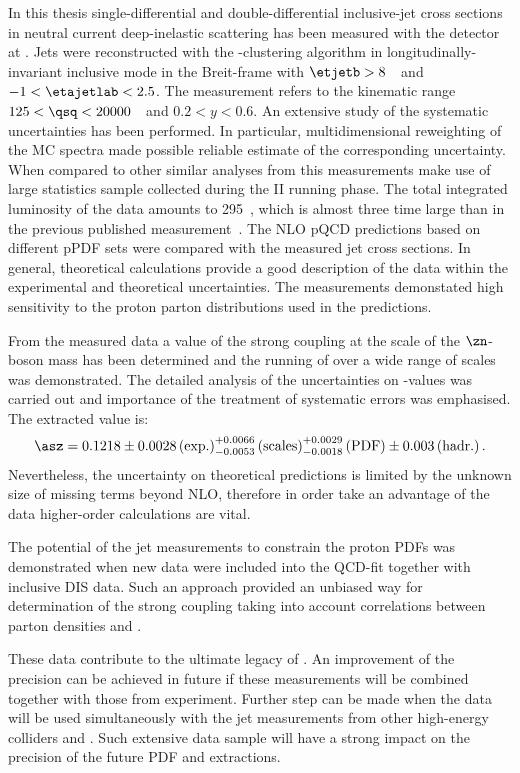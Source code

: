 In this thesis single-differential and double-differential inclusive-jet cross sections in neutral current deep-inelastic scattering has been measured with the \zeus detector at \hera. Jets were reconstructed with the \kt-clustering algorithm in longitudinally-invariant inclusive mode in the Breit-frame with $\etjetb > 8$~\GeV~and $-1<\etajetlab<2.5$. The measurement refers to the kinematic range $125 < \qsq < 20000$~\GeV~and $0.2<y<0.6$. An extensive study of the systematic uncertainties has been performed. In particular, multidimensional reweighting of the MC spectra made possible reliable estimate of the corresponding uncertainty. When compared to other similar analyses from \zeus this measurements make use of large statistics sample collected during the \hera II running phase. The total integrated luminosity of the data amounts to 295~\invpb, which is almost three time large than in the previous published measurement~\cite{inclusivejetDIS}. The NLO pQCD predictions based on different pPDF sets were compared with the measured jet cross sections. In general, theoretical calculations provide a good description of the data within the experimental and theoretical uncertainties. The measurements demonstated high sensitivity to the proton parton distributions used in the predictions.

From the measured data a value of the strong coupling at the scale of the $\zn$-boson mass has been determined and the running of \as over a wide range of scales was demonstrated. The detailed analysis of the uncertainties on \asz-values was carried out and importance of the treatment of systematic errors was emphasised. The extracted \asz value is:
\begin{equation}
 \asz = 0.1218 \pm 0.0028\left(\text{exp.}\right)^{+0.0066}_{-0.0053}\left(\text{scales}\right)^{+0.0029}_{-0.0018}\left(\text{PDF}\right)\pm{0.003}\left(\text{hadr.}\right).
\end{equation}
Nevertheless, the uncertainty on theoretical predictions is limited by the unknown size of missing terms beyond NLO, therefore in order take an advantage of the data higher-order calculations are vital.
 
The potential of the jet measurements to constrain the proton PDFs was demonstrated when new data were included into the QCD-fit together with inclusive DIS data. Such an approach provided an unbiased way for determination of the strong coupling taking into account correlations between parton densities and \as.

These data contribute to the ultimate legacy of \hera. An improvement of the precision can be achieved in future if these measurements will be combined together with those from \hone experiment. Further step can be made when the \hera data will be used simultaneously with the jet measurements from other high-energy colliders \lhc and \tevatron. Such extensive data sample will have a strong impact on the precision of the future PDF and \as extractions.

